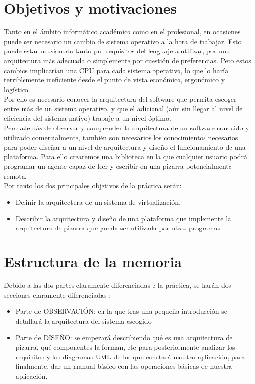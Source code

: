\section*{Objetivos y motivaciones}
Tanto en el ámbito informático académico como en el profesional, en ocasiones puede ser necesario un cambio de sistema operativo a la hora de trabajar. Esto puede estar ocasionado tanto por requisitos del lenguaje a utilizar, por una arquitectura más adecuada o simplemente por cuestión de preferencias. Pero estos cambios implicarían una CPU para cada sistema operativo, lo que lo haría terriblemente ineficiente desde el punto de vista económico, ergonómico y logístico. \\
Por ello es necesario conocer la arquitectura del software que permita escoger entre más de un sistema operativo, y que el adicional (aún sin llegar al nivel de eficiencia del sistema nativo) trabaje a un nivel óptimo.\\
Pero además de observar y comprender la arquitectura de un software conocido y utilizado comercialmente, también son necesarios los conocimientos necesarios para poder diseñar a un nivel de arquitectura y diseño el funcionamiento de una plataforma. Para ello crearemos una biblioteca en la que cualquier usuario podrá programar un agente capaz de leer y escribir en una pizarra potencialmente remota.\\
Por tanto los dos principales objetivos de la práctica serán:
\begin{itemize}
\item Definir la arquitectura de un sistema de virtualización.
\item Describir la arquitectura y diseño de una plataforma que implemente la arquitectura de pizarra que pueda ser utilizada por otros programas.
\end{itemize}

\section*{Estructura de la memoria}
Debido a las dos partes claramente diferenciadas e la práctica, se harán dos secciones claramente diferenciadas :
\begin{itemize}
\item Parte de OBSERVACIÓN: en la que tras una pequeña introducción se detallará la arquitectura del sistema escogido
\item Parte de DISEÑO: se empezará describiendo qué es una arquitectura de pizarra, qué componentes la forman, etc para posteriormente analizar los requisitos y los diagramas UML de los que constará nuestra aplicación, para finalmente, dar un manual básico con las operaciones básicas de nuestra aplicación. 
\end{itemize}

